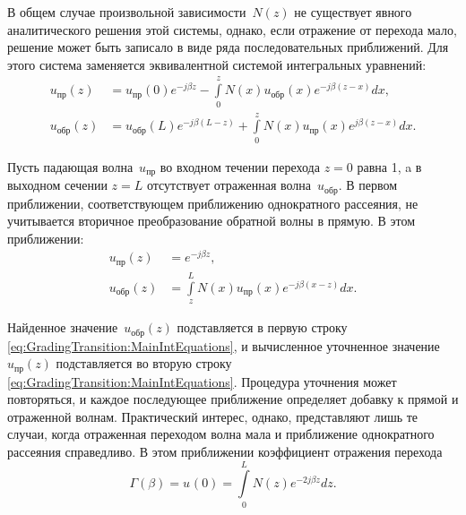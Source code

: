 В общем случае произвольной зависимости~$N(z)$ не существует явного
аналитического решения этой системы, однако, если отражение от перехода мало,
решение может быть записало в виде ряда последовательных приближений. Для этого
система заменяется эквивалентной системой интегральных уравнений:
\begin{align}
    \label{eq:GradingTransition:MainIntEquations}
    u_{пр}(z) &= u_{пр}(0) e^{-j\beta z} -
        \int\limits_0^z N(x) u_{обр}(x) e^{-j\beta (z-x)} dx, \\
    u_{обр}(z) &= u_{обр}(L) e^{-j\beta (L-z)} +
        \int\limits_0^z N(x) u_{пр}(x) e^{j\beta (z-x)} dx.
\end{align}

Пусть падающая волна~$u_{пр}$ во входном течении перехода $z=0$
равна 1, a в выходном сечении
$z=L$ отсутствует отраженная волна~$u_{обр}$. В первом приближении,
соответствующем приближению однократного рассеяния, не учитывается вторичное
преобразование обратной волны в прямую. В этом приближении:
\begin{align}
    \label{eq:GradingTransition:FirstApproximation}
    u_{пр}(z)  &= e^{-j\beta z}, \\
    u_{обр}(z) &= \int\limits_z^L N(x) u_{пр}(x) e^{-j\beta(x-z)} dx.
\end{align}

Найденное значение~$u_{обр}(z)$ подставляется в первую строку \eqref{eq:GradingTransition:MainIntEquations}, и
вычисленное уточненное значение $u_{пр}(z)$ подставляется во вторую строку \eqref{eq:GradingTransition:MainIntEquations}.
Процедура уточнения может повторяться, и каждое последующее приближение
определяет добавку к прямой и отраженной волнам. Практический интерес, однако,
представляют лишь те случаи, когда отраженная переходом волна мала и приближение
однократного рассеяния справедливо. В этом приближении коэффициент отражения
перехода
\begin{equation}
    \label{eq:GradingTransition:FirstApproximationReflectionCoeff}
    \Gamma(\beta)
        = u_{}(0)
        = \int\limits_0^L N(z) e^{-2j\beta z} dz.
\end{equation}

